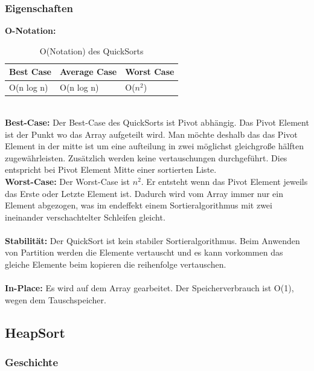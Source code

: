 \documentclass{article}
\begin{document}
\subsubsection*{Eigenschaften}
\textbf{O-Notation:}
\begin{table}[h]
\centering
\begin{tabular}{lll}
	\hline
	\textbf{Best Case} & \textbf{Average Case} & \textbf{Worst Case} \\
	\hline
	O(n log n) & O(n log n) & O($n^{2}$) \\
	\hline
\end{tabular}
\caption{O(Notation) des QuickSorts \cite{ONotationen}}
\label{tab:QuickSort}
\end{table}
\\
\textbf{Best-Case:} Der Best-Case des QuickSorts ist Pivot abhängig. Das Pivot Element ist der Punkt wo das Array aufgeteilt wird. Man möchte deshalb das das Pivot Element in der mitte ist um eine aufteilung in zwei möglichst gleichgroße hälften zugewährleisten. Zusätzlich werden keine vertauschungen durchgeführt. Dies entspricht bei Pivot Element Mitte einer sortierten Liste.\\
\textbf{Worst-Case:} Der Worst-Case ist  $n^{2}$. Er entsteht wenn das Pivot Element jeweils das Erste oder Letzte Element ist. Dadurch wird vom Array immer nur ein Element abgezogen, was im endeffekt einem Sortieralgorithmus mit zwei ineinander verschachtelter Schleifen gleicht.\\ \\
\textbf{Stabilität:} Der QuickSort ist kein stabiler Sortieralgorithmus. Beim Anwenden von Partition werden die Elemente vertauscht und es kann vorkommen das gleiche Elemente beim kopieren die reihenfolge vertauschen. \\
\\
\textbf{In-Place:} Es wird auf dem Array gearbeitet. Der Speicherverbrauch ist O(1), wegen dem Tauschspeicher.  \\
\subsection{HeapSort}
\subsubsection*{Geschichte}
\end{document}
